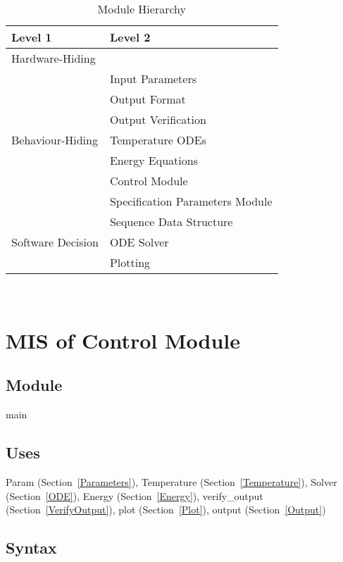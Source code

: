 \documentclass[12pt, titlepage]{article}
\begin{document}
\begin{table}[h!]
\centering
\begin{tabular}{p{} p{}}
\toprule
\textbf{Level 1} & \textbf{Level 2}\\
\midrule

{Hardware-Hiding} & ~ \\
\midrule

\multirow{7}{0.3\textwidth}{Behaviour-Hiding} & Input Parameters\\
& Output Format\\
& Output Verification\\
& Temperature ODEs\\
& Energy Equations\\ 
& Control Module\\
& Specification Parameters Module\\
\midrule

\multirow{3}{0.3\textwidth}{Software Decision} & {Sequence Data Structure}\\
& ODE Solver\\
& Plotting\\
\bottomrule

\end{tabular}
\caption{Module Hierarchy}
\label{TblMH}
\end{table}

\newpage
~\newpage

\section{MIS of Control Module} \label{Main}

\subsection{Module}

main

\subsection{Uses}

Param (Section~\ref{Parameters}), Temperature
(Section~\ref{Temperature}), Solver
(Section~\ref{ODE}), Energy (Section~\ref{Energy}), verify\_output (Section~\ref{VerifyOutput}), plot
(Section~\ref{Plot}), output (Section~\ref{Output})

\subsection{Syntax}
\end{document}
